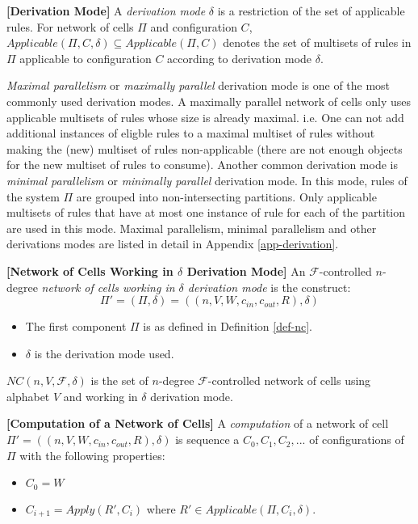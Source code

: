 \documentclass[a4paper]{article}
\theoremstyle{definition}
\begin{document}
\label{def-derv} \textbf{[Derivation Mode]} A \emph{derivation mode} $\delta$ is a
restriction of the set of applicable rules. For network of cells $\Pi$ and configuration $C$, 
$Applicable(\Pi, C, \delta) \subseteq Applicable(\Pi, C)$ denotes the set of multisets of
rules in $\Pi$ applicable to configuration $C$ according to derivation mode $\delta$. 

\emph{Maximal parallelism} or \emph{maximally parallel} derivation mode is one of the most commonly
used derivation modes. A maximally parallel network of cells only uses applicable multisets of rules
whose size is already maximal. i.e. One can not add additional instances of eligble rules to a
maximal multiset of rules without making the (new) multiset of rules non-applicable (there are not 
enough objects for the new multiset of rules to consume). Another common derivation mode is 
\emph{minimal parallelism} or \emph{minimally parallel} derivation mode. In this mode, rules of the 
system $\Pi$ are grouped into non-intersecting partitions. Only applicable multisets of rules that 
have at most one instance of rule for each of the partition are used in this mode. Maximal 
parallelism, minimal parallelism and other derivations modes are listed in detail in Appendix 
\ref{app-derivation}.


\label{def-nc3}\textbf{[Network of Cells Working in $\delta$ Derivation Mode]} An
$\mathscr{F}$-controlled $n$-degree \emph{network of cells working in $\delta$ derivation mode} is 
the construct: $$\Pi' = (\Pi,\delta) = ((n,V,W,c_{in},c_{out},R), \delta)$$
\begin{itemize}
\item The first component $\Pi$ is as defined in Definition \ref{def-nc}.
\item $\delta$ is the derivation mode used.
\end{itemize}

$NC(n,V,\mathscr{F},\delta)$ is the set of $n$-degree $\mathscr{F}$-controlled network of cells 
using alphabet $V$ and working in $\delta$ derivation mode.


\label{def-comp1}\textbf{[Computation of a Network of Cells]} A \emph{computation} of
a network of cell $\Pi' = ((n,V,W,c_{in},c_{out},R),\delta)$ is sequence a $C_0,C_1,C_2,...$ of
configurations of $\Pi$ with the following properties:
\begin{itemize}
\item $C_0 = W$
\item $C_{i+1} = Apply(R',C_i)$ where $R' \in Applicable(\Pi,C_i,\delta)$.
\end{itemize}
\end{document}
